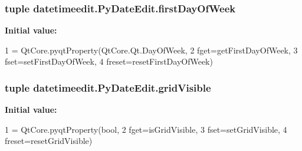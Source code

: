 \subsubsection[{first\+Day\+Of\+Week}]{\setlength{\rightskip}{0pt plus 5cm}tuple datetimeedit.\+Py\+Date\+Edit.\+first\+Day\+Of\+Week\hspace{0.3cm}{\ttfamily [static]}}\label{classdatetimeedit_1_1PyDateEdit_a242a6420c2322d019a80d5a7bec422a9}
{\bfseries Initial value\+:}
\begin{DoxyCode}
1 = QtCore.pyqtProperty(QtCore.Qt.DayOfWeek,
2                                          fget=getFirstDayOfWeek,
3                                          fset=setFirstDayOfWeek,
4                                          freset=resetFirstDayOfWeek)
\end{DoxyCode}
\hypertarget{classdatetimeedit_1_1PyDateEdit_aad6423f2f38acfd53026b99bca4c9d4a}{}
\subsubsection[{grid\+Visible}]{\setlength{\rightskip}{0pt plus 5cm}tuple datetimeedit.\+Py\+Date\+Edit.\+grid\+Visible\hspace{0.3cm}{\ttfamily [static]}}\label{classdatetimeedit_1_1PyDateEdit_aad6423f2f38acfd53026b99bca4c9d4a}
{\bfseries Initial value\+:}
\begin{DoxyCode}
1 = QtCore.pyqtProperty(bool,
2                                       fget=isGridVisible,
3                                       fset=setGridVisible,
4                                       freset=resetGridVisible)
\end{DoxyCode}
\hypertarget{classdatetimeedit_1_1PyDateEdit_adc2af361e79a7d3a25fb686f9a86cae7}{}
